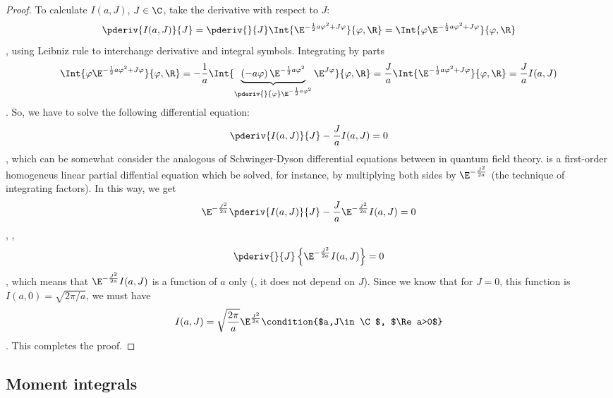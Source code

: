 \begin{proof}
To  calculate $I(a,J)$, $J\in\C$, take the derivative with respect to $J$:
\begin{dmath*}[compact]
   \pderiv{I(a,J)}{J} = \pderiv{}{J}\Int{\E^{-\frac{1}{2} a \varphi^{2} +
	 J\varphi}}{\varphi, \R} 
   = 
   \Int{ \varphi \E^{-\frac{1}{2}a\varphi^{2} + J\varphi}}{\varphi, \R}
\end{dmath*},
using Leibniz rule to interchange derivative and integral symbols.
Integrating by parts 
\begin{dmath*}[compact]
   \Int{ \varphi \E^{-\frac{1}{2}a\varphi^{2} + J\varphi}}{\varphi, \R}
   = -\frac{1}{a} \Int{ \underbrace{\left( -a \varphi \right) \E^{-\frac{1}{2} a
	    \varphi^{2}}}_{\pderiv{}{\varphi} \E^{-\frac{1}{2}a\varphi^{2}}}
      \E^{J\varphi}}{\varphi, \R}
   = \frac{J}{a} \Int{ \E^{-\frac{1}{2} a \varphi^{2} + J\varphi}}{\varphi, \R}
   = \frac{J}{a} I(a, J) 
\end{dmath*}.
So, we have to solve the following differential equation:
\begin{dmath}[label={piSD}]
   \pderiv{I(a,J)}{J} - \frac{J}{a} I(a,J) =0
\end{dmath},
which can be somewhat consider the analogous of Schwinger-Dyson differential
equations between in quantum field theory.
 is a first-order homogeneus linear partial diffential equation which be
solved, for instance, by multiplying both sides by $\E^{-
   \frac{J^{2}}{2a}}$ (the technique of integrating factors).
In this way, we get
\begin{dmath*}
   \E^{-\frac{J^{2}}{2a}} \pderiv{I(a,J)}{J} - \frac{J}{a}
   \E^{-\frac{J^{2}}{2a}} I(a,J) =0 
\end{dmath*},
\ie,
\begin{dmath*}
   \pderiv{}{J} \left\lbrace \E^{-\frac{J^{2}}{2a}} I(a,J) \right\rbrace =0 
\end{dmath*},
which means that $\E^{-\frac{J^{2}}{2a}} I(a,J)$ is a function of $a$ only (\ie, it
does not depend on $J$).
Since we know that for $J=0$, this function is $I(a,0) =
\sqrt{2\pi /a}$,  we must have
\begin{dmath*}
   I(a,J)= \sqrt{\frac{2\pi}{a}} \E^{\frac{J^{2}}{2a}} 
   \condition{$a,J\in\C$, $\Re a>0$}
\end{dmath*}.
This completes the proof.
\end{proof}




\subsection{Moment integrals}
\label{sec:1D moment integrals}

